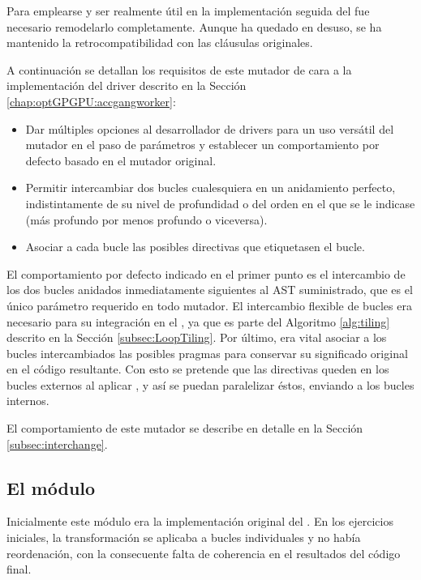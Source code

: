 Para emplearse y ser realmente útil en la implementación
seguida del  fue necesario remodelarlo completamente. Aunque ha 
quedado en desuso, se ha mantenido la retrocompatibilidad con las cláusulas \llc{} 
originales.

A continuación se detallan los requisitos de este mutador  de cara a la implementación del 
driver descrito en la Sección \ref{chap:optGPGPU:accgangworker}:

\begin{itemize}
\item Dar múltiples opciones al desarrollador de drivers para un uso versátil del mutador 
en el paso de parámetros y establecer un comportamiento por defecto basado en el mutador 
original.
\item Permitir intercambiar dos bucles cualesquiera en un anidamiento perfecto, 
indistintamente de su nivel de profundidad o del orden en el que se le indicase (más 
profundo por menos profundo o viceversa).
\item Asociar a cada bucle las posibles directivas que etiquetasen el bucle.
\end{itemize}

El comportamiento por defecto indicado en el primer punto es el intercambio de los dos 
bucles anidados inmediatamente siguientes al AST suministrado, que es el único parámetro 
requerido en todo mutador. El intercambio flexible de bucles era necesario para su 
integración en el , ya que es parte del Algoritmo 
\ref{alg:tiling} descrito en la Sección \ref{subsec:LoopTiling}. Por último, era vital
asociar a los bucles intercambiados las posibles pragmas para conservar su significado 
original en el código resultante. Con esto se pretende que las directivas queden en los 
bucles externos al aplicar \tiling{}, y así se puedan paralelizar éstos, enviando a \gpu{} 
los bucles internos. 

El comportamiento de este mutador se describe en detalle en la Sección 
\ref{subsec:interchange}.

\subsection{El módulo }

Inicialmente este módulo era la implementación original del \tiling{}. En los ejercicios 
iniciales, la transformación se aplicaba a bucles individuales y no había reordenación, 
con la consecuente falta de coherencia en el resultados del código final.

